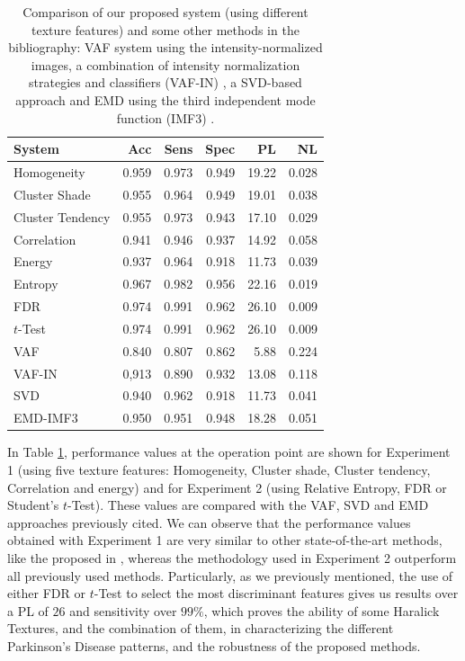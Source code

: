 \begin{table}[ht]
	\centering
	\begin{tabular}{l | rrrrr}
		\hline\hline
		\textbf{System}		& \textbf{Acc} 	& \textbf{Sens}	& \textbf{Spec}	& \textbf{PL}	& \textbf{NL}\\ 
		\hline
		Homogeneity & 0.959 & 0.973 & 0.949 & 19.22 & 0.028\\
		Cluster Shade & 0.955 & 0.964 & 0.949 & 19.01 & 0.038\\
		Cluster Tendency & 0.955 & 0.973 & 0.943 & 17.10 & 0.029\\
		Correlation & 0.941 & 0.946 & 0.937 & 14.92 & 0.058\\
		Energy & 0.937 & 0.964 & 0.918 & 11.73 & 0.039\\
		\hline
		Entropy	& 0.967	& 0.982	& 0.956	& 22.16	& 0.019 \\ %
		FDR	& 0.974	& 0.991	& 0.962	& 26.10	& 0.009 \\ %
		$t$-Test	& 0.974	& 0.991	& 0.962	& 26.10	& 0.009 \\ %
		\hline
		VAF & 0.840	& 0.807	& 0.862	& 5.88	& 0.224 \\
		VAF-IN & 0,913 & 0.890 & 0.932 & 13.08 & 0.118\\
		SVD & 0.940 & 0.962 & 0.918 & 11.73 & 0.041\\
		EMD-IMF3 & 0.950 & 0.951 & 0.948 & 18.28 & 0.051\\
		\hline\hline
	\end{tabular}
	\vspace{10pt}
	\caption{Comparison of our proposed system (using different texture features) and some other methods in the bibliography: VAF system using the intensity-normalized images,  a combination of intensity normalization strategies and classifiers (VAF-IN) \cite{Illan2012}, a SVD-based approach \cite{Segovia2012} and EMD using the third independent mode function (IMF3) \cite{Rojas2012}.}
	\label{tab:comparison}
\end{table}

In Table \ref{tab:comparison}, performance values at the operation point are shown for Experiment 1 (using five texture features: Homogeneity, Cluster shade, Cluster tendency, Correlation and energy) and for Experiment 2 (using Relative Entropy, FDR or Student's $t$-Test). These values are compared with the VAF, SVD and EMD approaches previously cited. We can observe that the performance values obtained with Experiment 1 are very similar to other state-of-the-art methods, like the proposed in \cite{Segovia2012,Rojas2012}, whereas the methodology used in Experiment 2 outperform all previously used methods. Particularly, as we previously mentioned, the use of either FDR or $t$-Test to select the most discriminant features gives us results over a PL of $26$ and sensitivity over $99\%$, which proves the ability of some Haralick Textures, and the combination of them, in characterizing the different Parkinson's Disease patterns, and the robustness of the proposed methods. 
